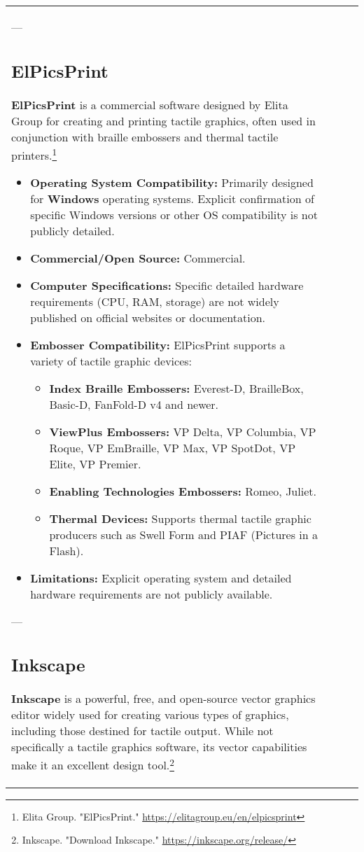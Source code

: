 \begin{longtable}{|l|l|l|l|}
{---

\subsection{ElPicsPrint}
\textbf{ElPicsPrint} is a commercial software designed by Elita Group for creating and printing tactile graphics, often used in conjunction with braille embossers and thermal tactile printers.\footnote{Elita Group. "ElPicsPrint." \url{https://elitagroup.eu/en/elpicsprint}}

\begin{itemize}
    \item \textbf{Operating System Compatibility:} Primarily designed for \textbf{Windows} operating systems. Explicit confirmation of specific Windows versions or other OS compatibility is not publicly detailed.
    \item \textbf{Commercial/Open Source:} Commercial.
    \item \textbf{Computer Specifications:} Specific detailed hardware requirements (CPU, RAM, storage) are not widely published on official websites or documentation.
    \item \textbf{Embosser Compatibility:} ElPicsPrint supports a variety of tactile graphic devices:
    \begin{itemize}
        \item \textbf{Index Braille Embossers:} Everest-D, BrailleBox, Basic-D, FanFold-D v4 and newer.
        \item \textbf{ViewPlus Embossers:} VP Delta, VP Columbia, VP Roque, VP EmBraille, VP Max, VP SpotDot, VP Elite, VP Premier.
        \item \textbf{Enabling Technologies Embossers:} Romeo, Juliet.
        \item \textbf{Thermal Devices:} Supports thermal tactile graphic producers such as Swell Form and PIAF (Pictures in a Flash).
    \end{itemize}
    \item \textbf{Limitations:} Explicit operating system and detailed hardware requirements are not publicly available.
\end{itemize}

---

\subsection{Inkscape}
\textbf{Inkscape} is a powerful, free, and open-source vector graphics editor widely used for creating various types of graphics, including those destined for tactile output. While not specifically a tactile graphics software, its vector capabilities make it an excellent design tool.\footnote{Inkscape. "Download Inkscape." \url{https://inkscape.org/release/}}

}
\end{longtable}
